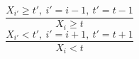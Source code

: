 $$\frac{X_{i'} \geq t',~i'=i-1,~t'=t-1}{X_{i} \geq t}$$ $$\frac{X_{i'}<t',~i'=i+1,~t'=t+1}{X_{i}<t}$$ 
